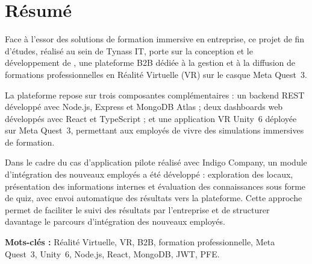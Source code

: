 \chapter*{R\'{e}sum\'{e}}

\vspace{0.5cm}

Face à l'essor des solutions de formation immersive en entreprise, ce projet de fin
d'études, réalisé au sein de Tynass IT, porte sur la conception et le développement
de \tynassit{}, une plateforme B2B dédiée à la gestion et à la diffusion de formations
professionnelles en Réalité Virtuelle (VR) sur le casque Meta Quest~3.

La plateforme repose sur trois composantes complémentaires : un backend REST
développé avec Node.js, Express et MongoDB Atlas ; deux dashboards web développés
avec React et TypeScript ; et une application VR Unity~6 déployée sur Meta Quest~3,
permettant aux employés de vivre des simulations immersives de formation.

Dans le cadre du cas d'application pilote réalisé avec Indigo Company, un module
d'intégration des nouveaux employés a été développé : exploration des locaux,
présentation des informations internes et évaluation des connaissances sous forme
de quiz, avec envoi automatique des résultats vers la plateforme. Cette approche
permet de faciliter le suivi des résultats par l'entreprise et de structurer davantage
le parcours d'intégration des nouveaux employés.

\textbf{Mots-clés :} Réalité Virtuelle, VR, B2B, formation professionnelle,
Meta Quest~3, Unity~6, Node.js, React, MongoDB, JWT, PFE.

\clearpage
